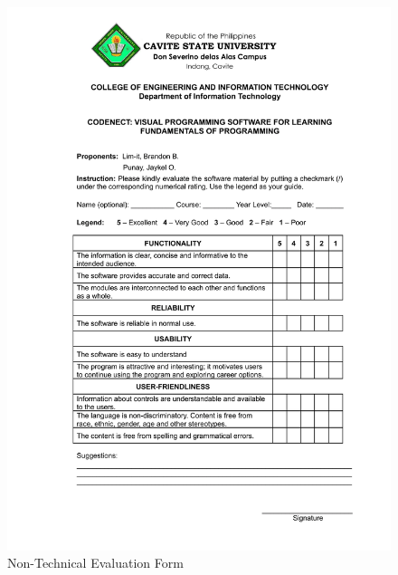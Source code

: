 \clearpage
{}
\null\vfill
\begin{figure}[H]
	 \centering
	 \includegraphics[width=\textwidth]{figures/non_tech_eval_form.png}
	 \caption[]{Non-Technical Evaluation Form}
	 \label{fig:non_tech_eval_form}
\end{figure}

